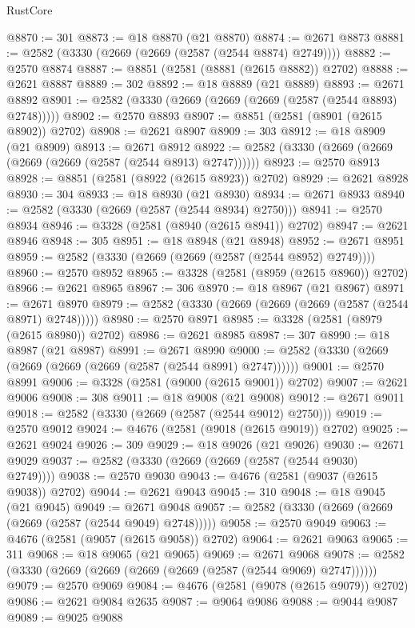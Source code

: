 \begin{lexlean}{RustCore}
\begin{coremodule}
@8870 := 301
@8873 := @18 @8870 (@21 @8870)
@8874 := @2671 @8873
@8881 := @2582 (@3330 (@2669 (@2669 (@2587 (@2544 @8874) @2749))))
@8882 := @2570 @8874
@8887 := @8851 (@2581 (@8881 (@2615 @8882)) @2702)
@8888 := @2621 @8887
@8889 := 302
@8892 := @18 @8889 (@21 @8889)
@8893 := @2671 @8892
@8901 := @2582 (@3330 (@2669 (@2669 (@2669 (@2587 (@2544 @8893) @2748)))))
@8902 := @2570 @8893
@8907 := @8851 (@2581 (@8901 (@2615 @8902)) @2702)
@8908 := @2621 @8907
@8909 := 303
@8912 := @18 @8909 (@21 @8909)
@8913 := @2671 @8912
@8922 := @2582 (@3330 (@2669 (@2669 (@2669 (@2669 (@2587 (@2544 @8913) @2747))))))
@8923 := @2570 @8913
@8928 := @8851 (@2581 (@8922 (@2615 @8923)) @2702)
@8929 := @2621 @8928
@8930 := 304
@8933 := @18 @8930 (@21 @8930)
@8934 := @2671 @8933
@8940 := @2582 (@3330 (@2669 (@2587 (@2544 @8934) @2750)))
@8941 := @2570 @8934
@8946 := @3328 (@2581 (@8940 (@2615 @8941)) @2702)
@8947 := @2621 @8946
@8948 := 305
@8951 := @18 @8948 (@21 @8948)
@8952 := @2671 @8951
@8959 := @2582 (@3330 (@2669 (@2669 (@2587 (@2544 @8952) @2749))))
@8960 := @2570 @8952
@8965 := @3328 (@2581 (@8959 (@2615 @8960)) @2702)
@8966 := @2621 @8965
@8967 := 306
@8970 := @18 @8967 (@21 @8967)
@8971 := @2671 @8970
@8979 := @2582 (@3330 (@2669 (@2669 (@2669 (@2587 (@2544 @8971) @2748)))))
@8980 := @2570 @8971
@8985 := @3328 (@2581 (@8979 (@2615 @8980)) @2702)
@8986 := @2621 @8985
@8987 := 307
@8990 := @18 @8987 (@21 @8987)
@8991 := @2671 @8990
@9000 := @2582 (@3330 (@2669 (@2669 (@2669 (@2669 (@2587 (@2544 @8991) @2747))))))
@9001 := @2570 @8991
@9006 := @3328 (@2581 (@9000 (@2615 @9001)) @2702)
@9007 := @2621 @9006
@9008 := 308
@9011 := @18 @9008 (@21 @9008)
@9012 := @2671 @9011
@9018 := @2582 (@3330 (@2669 (@2587 (@2544 @9012) @2750)))
@9019 := @2570 @9012
@9024 := @4676 (@2581 (@9018 (@2615 @9019)) @2702)
@9025 := @2621 @9024
@9026 := 309
@9029 := @18 @9026 (@21 @9026)
@9030 := @2671 @9029
@9037 := @2582 (@3330 (@2669 (@2669 (@2587 (@2544 @9030) @2749))))
@9038 := @2570 @9030
@9043 := @4676 (@2581 (@9037 (@2615 @9038)) @2702)
@9044 := @2621 @9043
@9045 := 310
@9048 := @18 @9045 (@21 @9045)
@9049 := @2671 @9048
@9057 := @2582 (@3330 (@2669 (@2669 (@2669 (@2587 (@2544 @9049) @2748)))))
@9058 := @2570 @9049
@9063 := @4676 (@2581 (@9057 (@2615 @9058)) @2702)
@9064 := @2621 @9063
@9065 := 311
@9068 := @18 @9065 (@21 @9065)
@9069 := @2671 @9068
@9078 := @2582 (@3330 (@2669 (@2669 (@2669 (@2669 (@2587 (@2544 @9069) @2747))))))
@9079 := @2570 @9069
@9084 := @4676 (@2581 (@9078 (@2615 @9079)) @2702)
@9086 := @2621 @9084 @2635
@9087 := @9064 @9086
@9088 := @9044 @9087
@9089 := @9025 @9088

\end{coremodule}
\end{lexlean}
